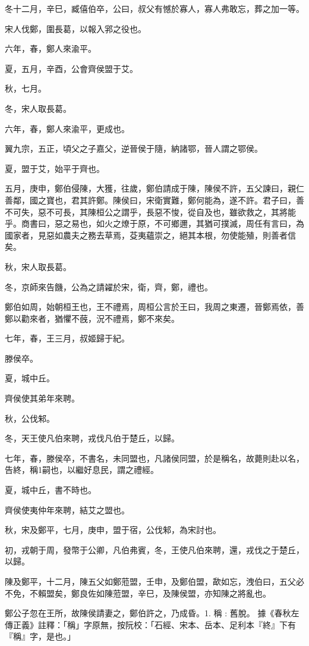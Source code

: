 \begin{pinyinscope}
冬十二月，辛巳，臧僖伯卒，公曰，叔父有憾於寡人，寡人弗敢忘，葬之加一等。

宋人伐鄭，圍長葛，以報入郛之役也。

六年，春，鄭人來渝平。

夏，五月，辛酉，公會齊侯盟于艾。

秋，七月。

冬，宋人取長葛。

六年，春，鄭人來渝平，更成也。

翼九宗，五正，頃父之子嘉父，逆晉侯于隨，納諸鄂，晉人謂之鄂侯。

夏，盟于艾，始平于齊也。

五月，庚申，鄭伯侵陳，大獲，往歲，鄭伯請成于陳，陳侯不許，五父諫曰，親仁善鄰，國之寶也，君其許鄭。陳侯曰，宋衛實難，鄭何能為，遂不許。君子曰，善不可失，惡不可長，其陳桓公之謂乎，長惡不悛，從自及也，雖欲救之，其將能乎。商書曰，惡之易也，如火之燎于原，不可鄉邇，其猶可撲滅，周任有言曰，為國家者，見惡如農夫之務去草焉，芟夷蘊崇之，絕其本根，勿使能殖，則善者信矣。

秋，宋人取長葛。

冬，京師來告饑，公為之請糴於宋，衛，齊，鄭，禮也。

鄭伯如周，始朝桓王也，王不禮焉，周桓公言於王曰，我周之東遷，晉鄭焉依，善鄭以勸來者，猶懼不蔇，況不禮焉，鄭不來矣。

七年，春，王三月，叔姬歸于紀。

滕侯卒。

夏，城中丘。

齊侯使其弟年來聘。

秋，公伐邾。

冬，天王使凡伯來聘，戎伐凡伯于楚丘，以歸。

七年，春，滕侯卒，不書名，未同盟也，凡諸侯同盟，於是稱名，故薨則赴以名，告終，稱1嗣也，以繼好息民，謂之禮經。

夏，城中丘，書不時也。

齊侯使夷仲年來聘，結艾之盟也。

秋，宋及鄭平，七月，庚申，盟于宿，公伐邾，為宋討也。

初，戎朝于周，發幣于公卿，凡伯弗賓，冬，王使凡伯來聘，還，戎伐之于楚丘，以歸。

陳及鄭平，十二月，陳五父如鄭蒞盟，壬申，及鄭伯盟，歃如忘，洩伯曰，五父必不免，不賴盟矣，鄭良佐如陳蒞盟，辛巳，及陳侯盟，亦知陳之將亂也。

鄭公子忽在王所，故陳侯請妻之，鄭伯許之，乃成昏。1. 稱 : 舊脫。 據《春秋左傳正義》註釋：「稱」字原無，按阮校：「石經、宋本、岳本、足利本『終』下有『稱』字，是也。」


\end{pinyinscope}

